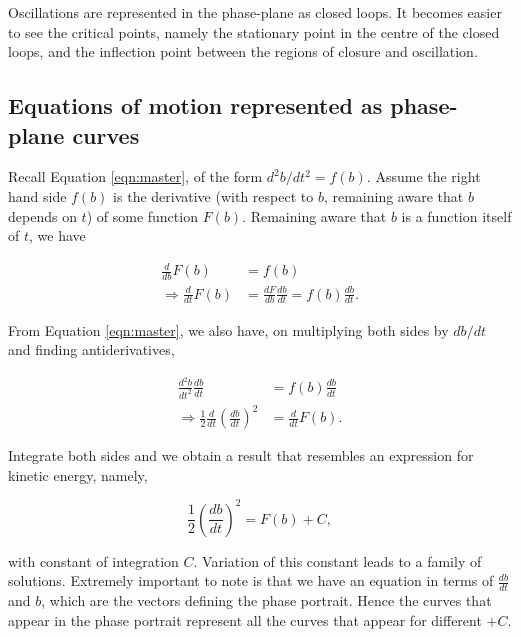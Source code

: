 \documentclass{article}
\begin{document}

Oscillations are represented in the phase-plane as closed loops.
It becomes easier to see the critical points,
namely the stationary point in the centre of the closed loops,
and the inflection point between the regions of closure and oscillation.

\subsection{Equations of motion represented as phase-plane curves}

Recall Equation \ref{eqn:master}, of the form $d^2b/dt^2 = f(b)$.
Assume the right hand side $f(b)$ is the derivative (with respect to $b$, remaining aware that $b$ depends on $t$) of some function $F(b)$.
Remaining aware that $b$ is a function itself of $t$, we have

\begin{align}
    \frac{d}{db}F(b)             & = f(b)                                            \\
    \Rightarrow \frac{d}{dt}F(b) & = \frac{dF}{db}\frac{db}{dt} = f(b)\frac{db}{dt}.
\end{align}

From Equation \ref{eqn:master}, we also have, on multiplying both sides by $db/dt$ and finding antiderivatives,

\begin{align}
    \frac{d^2b}{dt^2} \frac{db}{dt}                                   & = f(b) \frac{db}{dt} \\
    \Rightarrow \frac{1}{2}\frac{d}{dt}\left( \frac{db}{dt} \right)^2 & = \frac{d}{dt}F(b).
\end{align}

Integrate both sides and we obtain a result that resembles an expression for kinetic energy, namely,

\begin{equation}
    \frac{1}{2}\left(\frac{db}{dt}\right)^2 = F(b) + C,
    \label{eqn:integral_kinetic_energy}
\end{equation}

with constant of integration $C$. Variation of this constant leads to a family of solutions.
Extremely important to note is that we have an equation in terms of $\frac{db}{dt}$ and $b$, which are the vectors defining the phase portrait.
Hence the curves that appear in the phase portrait represent all the curves that appear for different $+C$.
\end{document}
